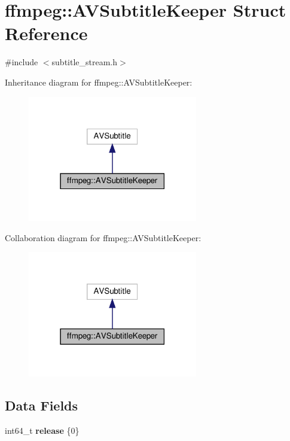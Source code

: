 \hypertarget{structffmpeg_1_1AVSubtitleKeeper}{}\section{ffmpeg\+:\+:A\+V\+Subtitle\+Keeper Struct Reference}
\label{structffmpeg_1_1AVSubtitleKeeper}


{\ttfamily \#include $<$subtitle\+\_\+stream.\+h$>$}



Inheritance diagram for ffmpeg\+:\+:A\+V\+Subtitle\+Keeper\+:
\nopagebreak
\begin{figure}[H]
\begin{center}
\leavevmode
\includegraphics[width=210pt]{structffmpeg_1_1AVSubtitleKeeper__inherit__graph}
\end{center}
\end{figure}


Collaboration diagram for ffmpeg\+:\+:A\+V\+Subtitle\+Keeper\+:
\nopagebreak
\begin{figure}[H]
\begin{center}
\leavevmode
\includegraphics[width=210pt]{structffmpeg_1_1AVSubtitleKeeper__coll__graph}
\end{center}
\end{figure}
\subsection*{Data Fields}
\begin{DoxyCompactItemize}
\item 
\mbox{\label{structffmpeg_1_1AVSubtitleKeeper_af894779e5247a33c67900537effa462d}} 
int64\+\_\+t {\bfseries release} \{0\}
\end{DoxyCompactItemize}



